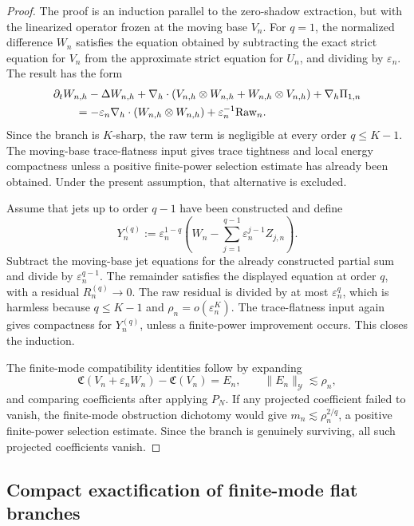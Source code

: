 \documentclass[11pt]{article}
\numberwithin{equation}{section}
\theoremstyle{plain}
\theoremstyle{definition}
\theoremstyle{remark}
\newcommand{\nabh}{\nabla_h}
\newcommand{\calC}{\mathfrak C}
\newcommand{\calY}{\mathcal Y}
\begin{document}
\begin{proof}
The proof is an induction parallel to the zero-shadow extraction, but with the linearized operator
frozen at the moving base \(V_n\).  For \(q=1\), the normalized difference \(W_n\) satisfies the
equation obtained by subtracting the exact strict equation for \(V_n\) from the approximate strict
equation for \(U_n\), and dividing by \(\varepsilon_n\).  The result has the form
\[
\begin{aligned}
        &\partial_t W_{n,h}-\Delta W_{n,h}
        +\nabh\cdot(V_{n,h}\otimes W_{n,h}+W_{n,h}\otimes V_{n,h})
        +\nabh\Pi_{1,n} \\
        &\qquad
        =
        -\varepsilon_n\nabh\cdot(W_{n,h}\otimes W_{n,h})
        +\varepsilon_n^{-1}{\rm Raw}_n.
\end{aligned}
\]
Since the branch is \(K\)-sharp, the raw term is negligible at every order \(q\le K-1\).  The
moving-base trace-flatness input gives trace tightness and local energy compactness unless a
positive finite-power selection estimate has already been obtained.  Under the present assumption,
that alternative is excluded.

Assume that jets up to order \(q-1\) have been constructed and define
\[
        Y^{(q)}_n
        :=
        \varepsilon_n^{1-q}
        \left(
        W_n-
        \sum_{j=1}^{q-1}\varepsilon_n^{j-1}Z_{j,n}
        \right).
\]
Subtract the moving-base jet equations for the already constructed partial sum and divide by
\(\varepsilon_n^{q-1}\).  The remainder satisfies the displayed equation at order \(q\), with a
residual \(R^{(q)}_n\to0\).  The raw residual is divided by at most \(\varepsilon_n^q\), which is
harmless because \(q\le K-1\) and \(\rho_n=o(\varepsilon_n^K)\).  The trace-flatness input again
gives compactness for \(Y^{(q)}_n\), unless a finite-power improvement occurs.  This closes the
induction.

The finite-mode compatibility identities follow by expanding
\[
        \calC(V_n+\varepsilon_nW_n)-\calC(V_n)=E_n,
        \qquad
        \|E_n\|_{\calY}\lesssim\rho_n,
\]
and comparing coefficients after applying \(P_N\).  If any projected coefficient failed to vanish,
the finite-mode obstruction dichotomy would give \(m_n\lesssim\rho_n^{2/q}\), a positive
finite-power selection estimate.  Since the branch is genuinely surviving, all such projected
coefficients vanish.
\end{proof}

\subsection{Compact exactification of finite-mode flat branches}
\label{pIII:sec:flat-branch-exactification}
\end{document}
